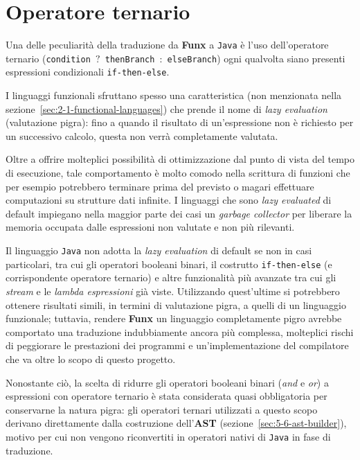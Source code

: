 \section{Operatore ternario}
\label{sec:4-2-ternary-operator}

Una delle peculiarità della traduzione da \textbf{Funx} a \texttt{Java} è l'uso dell'operatore ternario
(\texttt{condition $\mathord{?}$ thenBranch $\mathord{:}$ elseBranch}) ogni qualvolta
siano presenti espressioni condizionali \texttt{if-then-else}.


I linguaggi funzionali sfruttano spesso una caratteristica (non menzionata nella sezione~\ref{sec:2-1-functional-languages})
che prende il nome di \textit{lazy evaluation} (valutazione pigra): fino a quando il risultato di un'espressione
non è richiesto per un successivo calcolo, questa non verrà completamente valutata.

\noindent Oltre a offrire molteplici possibilità di ottimizzazione dal punto di vista del tempo di esecuzione,
tale comportamento è molto comodo nella scrittura di funzioni che per esempio potrebbero terminare
prima del previsto o magari effettuare computazioni su strutture dati infinite.
I linguaggi che sono \textit{lazy evaluated} di default impiegano nella maggior parte dei casi un \textit{garbage collector}
per liberare la memoria occupata dalle espressioni non valutate e non più rilevanti.


Il linguaggio \texttt{Java} non adotta la \textit{lazy evaluation} di default se non in casi particolari, tra cui
gli operatori booleani binari, il costrutto \texttt{if-then-else} (e corrispondente operatore ternario) e altre
funzionalità più avanzate tra cui gli \textit{stream} e le \textit{lambda espressioni} già viste.
Utilizzando quest'ultime si potrebbero ottenere risultati simili, in termini di valutazione pigra, a quelli di un linguaggio funzionale;
tuttavia, rendere \textbf{Funx} un linguaggio completamente pigro avrebbe comportato una traduzione indubbiamente ancora più complessa,
molteplici rischi di peggiorare le prestazioni dei programmi e un'implementazione del compilatore che va oltre lo scopo di questo progetto.


Nonostante ciò, la scelta di ridurre gli operatori booleani binari (\textit{and} e \textit{or}) a espressioni con operatore ternario
è stata considerata quasi obbligatoria per conservarne la natura pigra: gli operatori ternari utilizzati a questo scopo
derivano direttamente dalla costruzione dell'\textbf{AST} (sezione~\ref{sec:5-6-ast-builder}), motivo per cui non vengono riconvertiti
in operatori nativi di \texttt{Java} in fase di traduzione.


